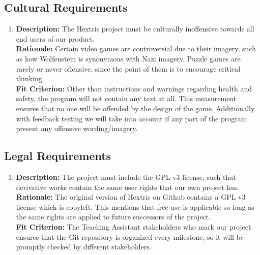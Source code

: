 \documentclass[12pt, titlepage]{article}
\begin{document}
\subsection{Cultural Requirements}
\begin{enumerate}[label=C\arabic*]
\item \textbf{Description:} The Hextris project must be culturally inoffensive towards all end users of our product. \\
\textbf{Rationale:}  Certain video games are controversial due to their imagery, such as how Wolfenstein is synonymous with Nazi imagery. Puzzle games are rarely or never offensive, since the point of them is to encourage critical thinking. \\
\textbf{Fit Criterion:} Other than instructions and warnings regarding health and safety, the program will not contain any text at all. This measurement ensures that no one will be offended by the design of the game. {\color{blue}Additionally with feedback testing we will take into account if any part of the program present any offensive wording/imagery.}

\end{enumerate}
\subsection{Legal Requirements}
\begin{enumerate}[label=L\arabic*]
\item \textbf{Description:} The project must include the GPL v3 license, such that derivative works contain the same user rights that our own project has. \\
\textbf{Rationale:} The original version of Hextris on Github contains a GPL v3 license which is copyleft. This mentions that free use is applicable so long as the same rights are applied to future successors of the project. \\
\textbf{Fit Criterion:} The Teaching Assistant stakeholders who mark our project ensures that the Git repository is organized every milestone, so it will be promptly checked by different stakeholders.

\end{enumerate}
\end{document}
